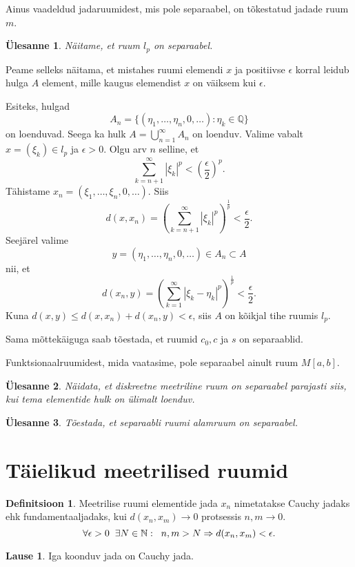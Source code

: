 \documentclass{article}[12pt]
\newcommand{\h}{\hspace{0.2cm}}
\newcommand{\N}{\mathbb{N}}
\newcommand{\Q}{\mathbb{Q}}
\newtheorem{yl}{Ülesanne}[section]
\theoremstyle{definition}
\newtheorem{definition}{Definitsioon}[section]
\theoremstyle{definition}
\theoremstyle{definition}
\newtheorem{lause}{Lause}[section]
\theoremstyle{break}
\begin{document}
Ainus vaadeldud jadaruumidest, mis pole separaabel, on tõkestatud jadade ruum $m$.

\begin{yl}
	Näitame, et ruum $l_p$ on separaabel.
\end{yl}

Peame selleks näitama, et mistahes ruumi elemendi $x$ ja positiivse $\epsilon$ korral leidub hulga $A$ element, mille kaugus elemendist $x$ on väiksem kui $\epsilon$.
	
Esiteks, hulgad 
\[
	A_n = \{ (\eta_1,\dots, \eta_n,0,\dots):\eta_k\in\Q \}
\]
on loenduvad.
Seega ka hulk $A=\bigcup_{n=1}^\infty A_n$ on loenduv.
Valime vabalt $x=(\xi_k)\in l_p$ ja $\epsilon > 0$.
Olgu arv $n$ selline, et
\[
	\sum_{k=n+1}^\infty | \xi_k|^p < \left(\frac{\epsilon}{2}\right)^p.
\]
Tähistame $x_n = (\xi_1,\dots,\xi_n,0,\dots)$. 
Siis
\[
	d(x,x_n) = \left(\sum_{k=n+1}^\infty | \xi_k|^p\right)^\frac{1}{p} < \frac{\epsilon}{2}.
\]
Seejärel valime
\[
	y = (\eta_1,\dots,\eta_n,0,\dots)\in A_n\subset A
\]
nii, et
\[
	d(x_n,y) = \left(\sum_{k=1}^\infty | \xi_k-\eta_k |^p\right)^\frac{1}{p} < \frac{\epsilon}{2}.
\]
Kuna $d(x,y) \leq d(x,x_n) + d(x_n, y) < \epsilon$, siis $A$ on kõikjal tihe ruumis $l_p$.

Sama mõttekäiguga saab tõestada, et ruumid $c_0, c$ ja $s$ on separaablid.

Funktsionaalruumidest, mida vaatasime, pole separaabel ainult ruum $M[a,b]$.

\begin{yl}
	Näidata, et diskreetne meetriline ruum on separaabel parajasti siis, kui tema elementide hulk on ülimalt loenduv.
\end{yl}

\begin{yl}
	Tõestada, et separaabli ruumi alamruum on separaabel.
\end{yl}

\section{Täielikud meetrilised ruumid}
\begin{definition}
	Meetrilise ruumi elementide jada $x_n$ nimetatakse Cauchy jadaks ehk fundamentaaljadaks, kui $d(x_n,x_m)\rightarrow 0$ protsessis $n,m\rightarrow 0$.
	\[
		\forall \epsilon > 0\h\exists N\in\N: \h n,m>N\Rightarrow d(x_n,x_m) < \epsilon.
	\]
\end{definition}

\begin{lause}
	Iga koonduv jada on Cauchy jada.
\end{lause}
\end{document}

